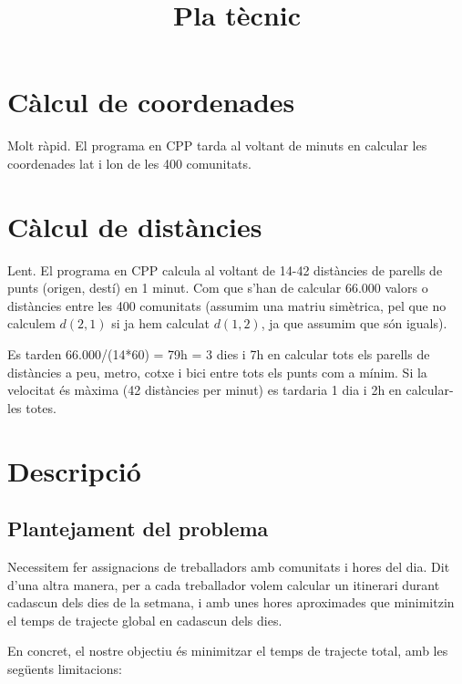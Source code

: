 \documentclass[12pt]{article}
\title{Pla tècnic}
\date{}
\begin{document}
\maketitle

\tableofcontents

\section{Càlcul de coordenades}

Molt ràpid.
El programa en CPP tarda al voltant de minuts en calcular les coordenades lat i lon de les 400 comunitats.

\section{Càlcul de distàncies}

Lent.
El programa en CPP calcula al voltant de 14-42 distàncies de parells de punts (origen, destí) en 1 minut.
Com que s'han de calcular 66.000 valors o distàncies entre les 400 comunitats (assumim una matriu simètrica, pel que no calculem $d(2,1)$ si ja hem calculat $d(1,2)$, ja que assumim que són iguals).

Es tarden 66.000/(14*60) = 79h = 3 dies i 7h en calcular tots els parells de distàncies a peu, metro, cotxe i bici entre tots els punts com a mínim.
Si la velocitat és màxima (42 distàncies per minut) es tardaria 1 dia i 2h en calcular-les totes.

\section{Descripció}

\subsection{Plantejament del problema}

Necessitem fer assignacions de treballadors amb comunitats i hores del dia.
Dit d'una altra manera, per a cada treballador volem calcular un itinerari durant cadascun dels dies de la setmana, i amb unes hores aproximades que minimitzin el temps de trajecte global en cadascun dels dies.

En concret, el nostre objectiu és minimitzar el temps de trajecte total, amb les següents limitacions:
\end{document}
